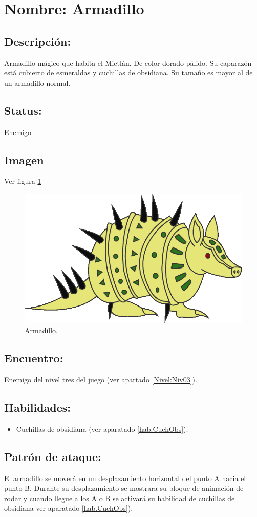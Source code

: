 \section{Nombre: Armadillo}  \label{per:armadillo} 
\subsection{Descripción:}
Armadillo mágico que habita el Mictlán. De color dorado pálido. Su caparazón está cubierto de esmeraldas y cuchillas de obsidiana. Su tamaño es mayor al de un armadillo normal. 
\subsection{Status:}
Enemigo
\subsection{Imagen}
Ver figura \ref{fig:armadillo}
\begin{figure}
	\centering
	\includegraphics[height=0.2 \textheight]{Imagenes/armadillo}
	\caption{Armadillo.}
	\label{fig:armadillo}
\end{figure} 

\subsection{Encuentro:}
Enemigo del nivel tres del juego (ver apartado \ref{Nivel:Niv03}).
\subsection{Habilidades:}
\begin{itemize}
	\item Cuchillas de obsidiana (ver aparatado \ref{hab.CuchObs}).
\end{itemize}
\subsection{Patrón de ataque:}
El armadillo se moverá en un desplazamiento horizontal del punto A hacia el punto B. Durante su desplazamiento se mostrara su bloque de animación de rodar y cuando llegue a los A o B se activará su habilidad de cuchillas de obsidiana ver aparatado \ref{hab.CuchObs}). 